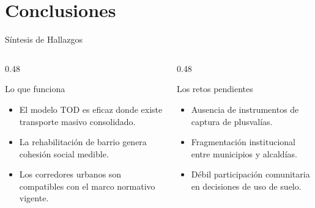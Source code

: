 
\section{Conclusiones}

\begin{frame}{Síntesis de Hallazgos}
  \begin{columns}[T]
    \begin{column}{0.48\textwidth}
      \begin{block}{Lo que funciona}
        \begin{itemize}
          \item El modelo TOD es eficaz donde existe transporte masivo consolidado.
          \item La rehabilitación de barrio genera cohesión social medible.
          \item Los corredores urbanos son compatibles con el marco normativo vigente.
        \end{itemize}
      \end{block}
    \end{column}
    \begin{column}{0.48\textwidth}
      \begin{alertblock}{Los retos pendientes}
        \begin{itemize}
          \item Ausencia de instrumentos de captura de plusvalías.
          \item Fragmentación institucional entre municipios y alcaldías.
          \item Débil participación comunitaria en decisiones de uso de suelo.
        \end{itemize}
      \end{alertblock}
    \end{column}
  \end{columns}
\end{frame}


